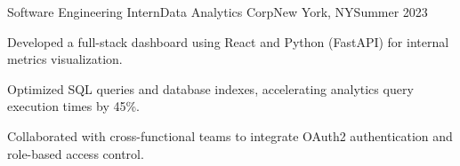 \begin{cventry}{Software Engineering Intern}{Data Analytics Corp}{New York, NY}{Summer 2023}
    \item Developed a full-stack dashboard using React and Python (FastAPI) for internal metrics visualization.
    \item Optimized SQL queries and database indexes, accelerating analytics query execution times by 45\%.
    \item Collaborated with cross-functional teams to integrate OAuth2 authentication and role-based access control.
\end{cventry}
